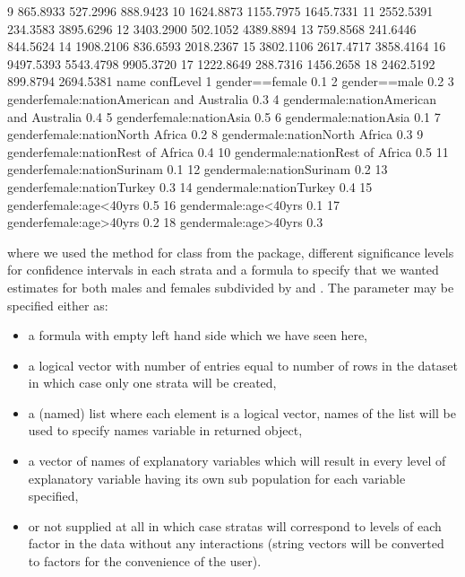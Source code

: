 \documentclass[
]{jss}
\newcommand{\1}{\mathcal{I}} \newcommand{\bx}{\boldsymbol{x}}
\begin{document}
\begin{CodeChunk}
\begin{CodeOutput}
9          865.8933            527.2996            888.9423
10        1624.8873           1155.7975           1645.7331
11        2552.5391            234.3583           3895.6296
12        3403.2900            502.1052           4389.8894
13         759.8568            241.6446            844.5624
14        1908.2106            836.6593           2018.2367
15        3802.1106           2617.4717           3858.4164
16        9497.5393           5543.4798           9905.3720
17        1222.8649            288.7316           1456.2658
18        2462.5192            899.8794           2694.5381
                                        name confLevel
1                             gender==female       0.1
2                               gender==male       0.2
3  genderfemale:nationAmerican and Australia       0.3
4    gendermale:nationAmerican and Australia       0.4
5                    genderfemale:nationAsia       0.5
6                      gendermale:nationAsia       0.1
7            genderfemale:nationNorth Africa       0.2
8              gendermale:nationNorth Africa       0.3
9          genderfemale:nationRest of Africa       0.4
10           gendermale:nationRest of Africa       0.5
11                genderfemale:nationSurinam       0.1
12                  gendermale:nationSurinam       0.2
13                 genderfemale:nationTurkey       0.3
14                   gendermale:nationTurkey       0.4
15                    genderfemale:age<40yrs       0.5
16                      gendermale:age<40yrs       0.1
17                    genderfemale:age>40yrs       0.2
18                      gendermale:age>40yrs       0.3
\end{CodeOutput}
\end{CodeChunk}

\normalsize

where we used the  method for 
class from the  package, different significance levels
for confidence intervals in each strata and a formula to specify that we
wanted estimates for both males and females subdivided by 
and . The  parameter may be specified either as:

\begin{itemize}
\item a formula with empty left hand side which we have seen here,
\item a logical vector with number of entries equal to number of rows in the dataset in which case only one strata will be created,
\item a (named) list where each element is a logical vector, names of the list will be used to specify names variable in returned object,
\item a vector of names of explanatory variables which will result in every level of explanatory variable having its own sub population for each variable specified,
\item or not supplied at all in which case stratas will correspond to levels of each factor in the data without any interactions (string vectors will be converted to factors for the convenience of the user).
\end{itemize}
\end{document}
